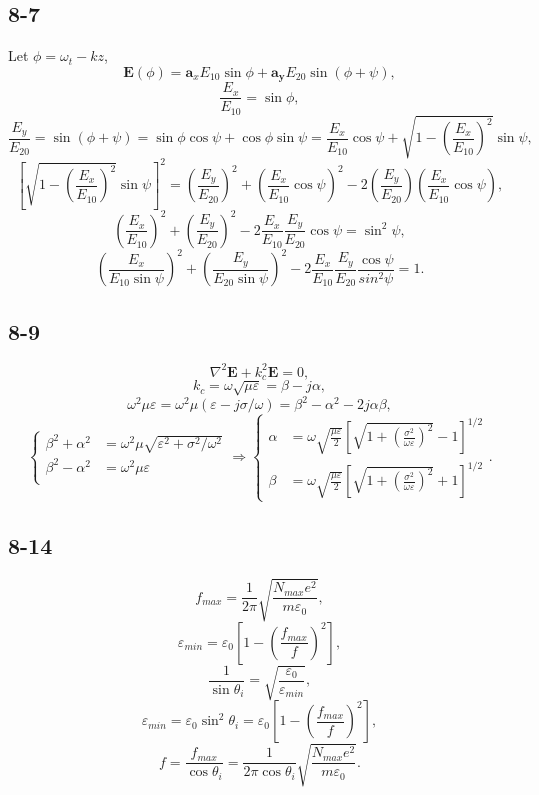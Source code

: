 \documentclass[6pt,a4paper]{article}
\begin{document}
\subsection{8-7}
Let $\phi=\omega_t-kz$,
$$\mathbf{E}(\phi)=\mathbf{a}_xE_{10}\sin\phi+\mathbf{a_y}E_{20}\sin(\phi+\psi),$$
$$\frac{E_x}{E_{10}}=\sin\phi,$$
$$\frac{E_y}{E_{20}}=\sin(\phi+\psi)=\sin\phi\cos\psi+\cos\phi\sin\psi=\frac{E_x}{E_{10}}\cos\psi+\sqrt{1-\left(\frac{E_x}{E_{10}}\right)^2}\sin\psi,$$
$$\left[\sqrt{1-\left(\frac{E_x}{E_{10}}\right)^2}\sin\psi\right]^2=\left(\frac{E_y}{E_{20}}\right)^2+\left(\frac{E_x}{E_{10}}\cos\psi\right)^2-2\left(\frac{E_y}{E_{20}}\right)\left(\frac{E_x}{E_{10}}\cos\psi\right),$$
$$\left(\frac{E_x}{E_{10}}\right)^2+\left(\frac{E_y}{E_{20}}\right)^2-2\frac{E_x}{E_{10}}\frac{E_y}{E_{20}}\cos\psi=\sin^2\psi,$$
$$\left(\frac{E_x}{E_{10}\sin\psi}\right)^2+\left(\frac{E_y}{E_{20}\sin\psi}\right)^2-2\frac{E_x}{E_{10}}\frac{E_y}{E_{20}}\frac{\cos\psi}{sin^2\psi}=1.$$

\subsection{8-9}
$$\nabla^2\mathbf{E}+k_c^2\mathbf{E}=0,$$
$$k_c=\omega\sqrt{\mu\varepsilon}=\beta-j\alpha,$$
$$\omega^2\mu\varepsilon=\omega^2\mu(\varepsilon-j\sigma/\omega)=\beta^2-\alpha^2-2j\alpha\beta,$$
$$\left\{\begin{aligned}
\beta^2+\alpha^2&=\omega^2\mu\sqrt{\varepsilon^2+\sigma^2/\omega^2}\\
\beta^2-\alpha^2&=\omega^2\mu\varepsilon\\
\end{aligned}\right.\Longrightarrow\left\{\begin{aligned}
\alpha&=\omega\sqrt{\frac{\mu\varepsilon}{2}}\left[\sqrt{1+\left(\frac{\sigma^2}{\omega\varepsilon}\right)^2}-1\right]^{1/2}\\
\beta&=\omega\sqrt{\frac{\mu\varepsilon}{2}}\left[\sqrt{1+\left(\frac{\sigma^2}{\omega\varepsilon}\right)^2}+1\right]^{1/2}
\end{aligned}\right..$$

\subsection{8-14}
$$f_{max}=\frac{1}{2\pi}\sqrt{\frac{N_{max}e^2}{m\varepsilon_0}},$$
$$\varepsilon_{min}=\varepsilon_0\left[1-\left(\frac{f_{max}}{f}\right)^2\right],$$
$$\frac{1}{\sin\theta_i}=\sqrt{\frac{\varepsilon_0}{\varepsilon_{min}}},$$
$$\varepsilon_{min}=\varepsilon_0\sin^2\theta_i=\varepsilon_0\left[1-\left(\frac{f_{max}}{f}\right)^2\right],$$
$$f=\frac{f_{max}}{\cos\theta_i}=\frac{1}{2\pi\cos\theta_i}\sqrt{\frac{N_{max}e^2}{m\varepsilon_0}}.$$
\end{document}
